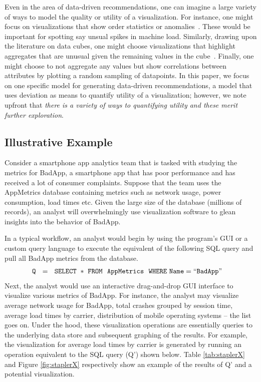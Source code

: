 Even in the area of data-driven recommendations, one can imagine a large variety of ways to model the quality or utility
of a visualization.
For instance, one might focus on visualizations that show order statistics or anomalies~\cite{kandel}. 
These would be important for spotting say unsual spikes in machine load.
Similarly, drawing upon the literature on data cubes, one might choose visualizations that highlight aggregates that
are unusual given the remaining values in the cube~\cite{sarawagi}.
Finally, one might choose to not aggregate any values but show correlations between attributes by plotting a random
sampling of datapoints.
In this paper, we focus on one specific model for generating data-driven recommendations, a model that uses
deviation as means to quantify utility of a visualization; however, we note upfront
that {\it there is a variety of ways to quantifying utility and these merit further exploration}.


\subsection*{Illustrative Example}

Consider a smartphone app analytics team that is tasked with studying the metrics for BadApp, a smartphone app that has
poor performance and has received a lot of consumer complaints. 
Suppose that the team uses the AppMetrics database containing metrics such as network usage, 
power consumption, load times etc.
Given the large size of the database (millions of records), an analyst will 
overwhelmingly use visualization software to glean insights into the behavior of BadApp.

In a typical workflow, an analyst would begin by using the program's GUI or a custom query language to execute the equivalent
of the following SQL query and pull all BadApp metrics from the database. 
\noindent 
\begin{align*}
& \tt Q \ \ = \ \ SELECT \ * \ FROM \ \  AppMetrics \ \ WHERE  \ Name=``BadApp"
\end{align*}
Next, the analyst would use an interactive drag-and-drop GUI interface to visualize various metrics of BadApp.
For instance, the analyst may visualize average network usage for BadApp, total crashes grouped by session time,
average load times by carrier, distribution of mobile operating systems -- the list goes on.
Under the hood, these visualization operations are essentially queries to the underlying data store and subsequent graphing of 
the results.
For example, the visualization for average load times by carrier is generated by running an operation equivalent to the
SQL query (Q') shown below.
Table \ref{tab:staplerX} and Figure \ref{fig:staplerX} respectively show an example of the results of Q' and a potential
visualization.

